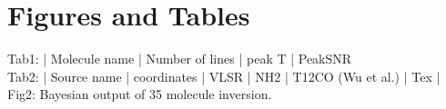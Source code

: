 \section{Figures and Tables}
 Tab1: | Molecule name | Number of lines | peak T | PeakSNR \\ 
 Tab2: | Source name | coordinates | VLSR | NH2 | T12CO (Wu et al.) | Tex | 
 Fig2: Bayesian output of 35 molecule inversion. 
 
  
  
  
  
  
  
  